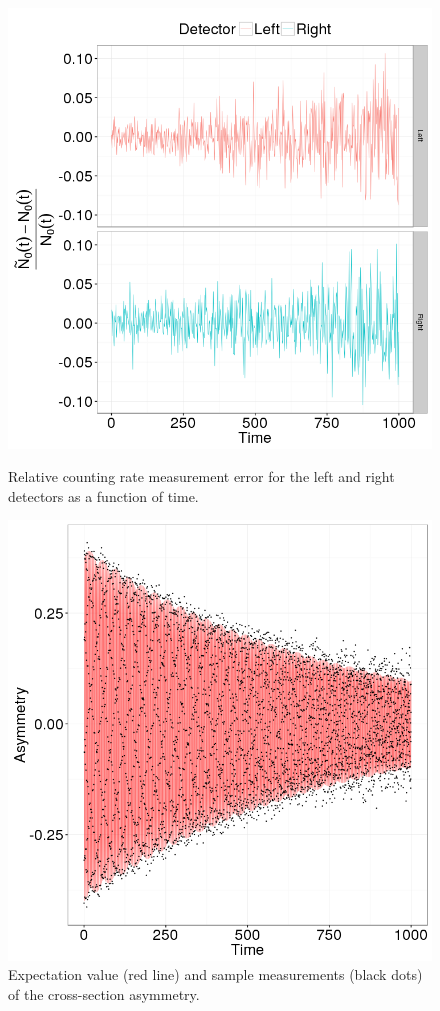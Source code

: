 \documentclass{jpconf}
\begin{document}
\begin{figure}[h]
	\begin{minipage}{.45\textwidth}
		\centering
		\includegraphics[scale=.4]{img/Final/LR_detector_relErr}
		\caption{Relative counting rate measurement error for the left and right detectors as a function of time.\label{fig:LRDetErr}}
	\end{minipage}\hspace{.5in}
	\begin{minipage}{.45\textwidth}
		\centering
		\includegraphics[scale=.4]{img/Final/Asymmetry}
		\caption{Expectation value (red line) and sample measurements (black dots) of the cross-section asymmetry.\label{fig:Asym}}
	\end{minipage}
	

\end{figure}
\end{document}
